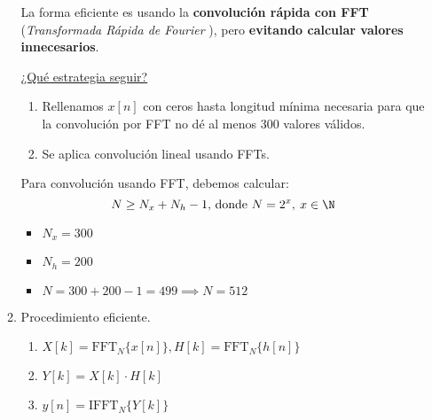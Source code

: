 \begin{enumerate}[label=\color{red}\textbf{\alph*)}]
\begin{enumerate}[label=Paso \arabic*:]
                La forma eficiente es usando la \textbf{convolución rápida con FFT} (\textit{Transformada Rápida de Fourier} ), pero \textbf{evitando calcular valores innecesarios}. 

        \underline{¿Qué estrategia seguir?} 
        \begin{enumerate}[label=\arabic*)]
            \item Rellenamos $x[n]$ con ceros hasta longitud mínima necesaria para que la convolución por FFT no dé al menos 300 valores válidos.
            \item Se aplica convolución lineal usando FFTs. 
        \end{enumerate}
        Para convolución usando FFT, debemos calcular: \[
        N\ge N_x+N_h-1\text{, donde }N=2^x,\:x\in \N
        \] 
        \begin{itemize}[label=\textbullet]
            \item $N_x=300$
            \item  $N_h=200$
            \item  $N=300+200-1=499\implies N=512$
        \end{itemize}
    \item Procedimiento eficiente.
        \begin{enumerate}[label=\arabic*)]
            \item $X[k]=\text{FFT}_N\{x[n]\}, H[k]=\text{FFT}_N\{h[n]\} $ 
            \item $Y[k]=X[k]\cdot H[k]$
            \item $y[n]=\text{IFFT}_N \{Y[k]\} $
        \end{enumerate}
        \end{enumerate}
\end{enumerate}



